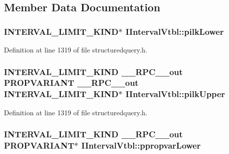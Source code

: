 \subsection{Member Data Documentation}
\subsubsection[{\texorpdfstring{pilk\+Lower}{pilkLower}}]{ {\bf I\+N\+T\+E\+R\+V\+A\+L\+\_\+\+L\+I\+M\+I\+T\+\_\+\+K\+I\+ND}$\ast$ I\+Interval\+Vtbl\+::pilk\+Lower}\hypertarget{struct_i_interval_vtbl_a1e348828daee912b1bfc3bfdddcfc001}{}\label{struct_i_interval_vtbl_a1e348828daee912b1bfc3bfdddcfc001}


Definition at line 1319 of file structuredquery.\+h.

\subsubsection[{\texorpdfstring{pilk\+Upper}{pilkUpper}}]{ {\bf I\+N\+T\+E\+R\+V\+A\+L\+\_\+\+L\+I\+M\+I\+T\+\_\+\+K\+I\+ND} {\bf \+\_\+\+\_\+\+R\+P\+C\+\_\+\+\_\+out} {\bf P\+R\+O\+P\+V\+A\+R\+I\+A\+NT} {\bf \+\_\+\+\_\+\+R\+P\+C\+\_\+\+\_\+out} {\bf I\+N\+T\+E\+R\+V\+A\+L\+\_\+\+L\+I\+M\+I\+T\+\_\+\+K\+I\+ND}$\ast$ I\+Interval\+Vtbl\+::pilk\+Upper}\hypertarget{struct_i_interval_vtbl_a8857493b9d7786658725be73b3e93a87}{}\label{struct_i_interval_vtbl_a8857493b9d7786658725be73b3e93a87}


Definition at line 1319 of file structuredquery.\+h.

\subsubsection[{\texorpdfstring{ppropvar\+Lower}{ppropvarLower}}]{ {\bf I\+N\+T\+E\+R\+V\+A\+L\+\_\+\+L\+I\+M\+I\+T\+\_\+\+K\+I\+ND} {\bf \+\_\+\+\_\+\+R\+P\+C\+\_\+\+\_\+out} {\bf P\+R\+O\+P\+V\+A\+R\+I\+A\+NT}$\ast$ I\+Interval\+Vtbl\+::ppropvar\+Lower}\hypertarget{struct_i_interval_vtbl_a651120f300ba61843d2a0cc79e305c56}{}\label{struct_i_interval_vtbl_a651120f300ba61843d2a0cc79e305c56}


